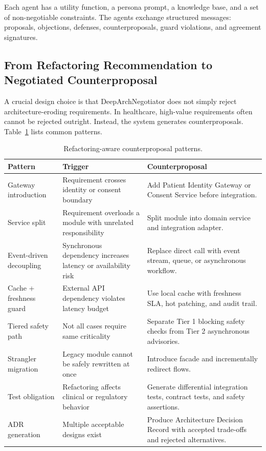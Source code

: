 \documentclass[english,preprint,nonatbib]{elsarticle}
\begin{document}
Each agent has a utility function, a persona prompt, a knowledge base, and a set of non-negotiable constraints.
The agents exchange structured messages: proposals, objections, defenses, counterproposals, guard violations, and agreement signatures.

\subsection{From Refactoring Recommendation to Negotiated Counterproposal}

A crucial design choice is that DeepArchNegotiator does not simply reject architecture-eroding requirements.
In healthcare, high-value requirements often cannot be rejected outright. Instead, the system generates counterproposals. Table~\ref{tab:counterproposal-patterns} lists common patterns.

\begin{longtable}{p{3.5cm}p{5cm}p{7.5cm}}
\caption{Refactoring-aware counterproposal patterns.}\label{tab:counterproposal-patterns}\\
\toprule
Pattern & Trigger & Counterproposal \\
\midrule
Gateway introduction & Requirement crosses identity or consent boundary & Add Patient Identity Gateway or Consent Service before integration.
\\
Service split & Requirement overloads a module with unrelated responsibility & Split module into domain service and integration adapter.
\\
Event-driven decoupling & Synchronous dependency increases latency or availability risk & Replace direct call with event stream, queue, or asynchronous workflow.
\\
Cache + freshness guard & External API dependency violates latency budget & Use local cache with freshness SLA, hot patching, and audit trail.
\\
Tiered safety path & Not all cases require same criticality & Separate Tier 1 blocking safety checks from Tier 2 asynchronous advisories.
\\
Strangler migration & Legacy module cannot be safely rewritten at once & Introduce facade and incrementally redirect flows.
\\
Test obligation & Refactoring affects clinical or regulatory behavior & Generate differential integration tests, contract tests, and safety assertions.
\\
ADR generation & Multiple acceptable designs exist & Produce Architecture Decision Record with accepted trade-offs and rejected alternatives.
\\
\bottomrule
\end{longtable}
\end{document}
